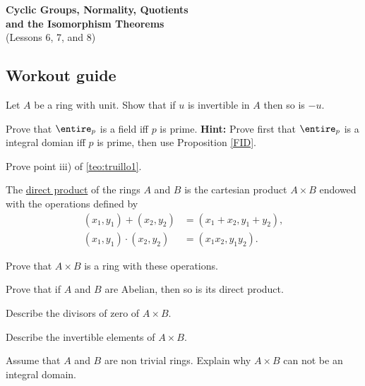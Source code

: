 \documentclass[
    11pt,a4paper,
]{exam}
\begin{document}
\def\contador{Problem Set 3}


\begin{center}
    {\bfseries\Large
        Cyclic Groups, Normality, Quotients  \\ and the Isomorphism Theorems}\\
    (Lessons 6, 7, and 8)
\end{center}


\begin{questions}
    \section{Workout guide}

\begin{ejercicio}
Let $A$ be a ring with unit. Show that if $u$ is invertible in $A$ then so is $-u$.
\end{ejercicio}

\begin{ejercicio}
 Prove that $\entire_p$ is a field iff $p$ is prime. 
 \textbf{Hint:} Prove first that $\entire_p$ is a integral domian iff $p$ is prime, then use Proposition \ref{FID}.
\end{ejercicio}

\begin{ejercicio}
Prove point iii) of \ref{teo:truillo1}.
\end{ejercicio}


\begin{ejercicio}
The \underline{direct product} of the rings $A$ and $B$ is the cartesian product $A\times B$ endowed with the operations defined by
\begin{align*}
(x_1,y_1) + (x_2,y_2) &= (x_1+x_2, y_1+y_2),
\\
(x_1,y_1) \cdot (x_2,y_2) &= (x_1 x_2, y_1 y_2).
\end{align*}
\begin{my_enumerate}
\item Prove that $A\times B$ is a ring with these operations.
\item Prove that if $A$ and $B$ are Abelian, then so is its direct product.
\item Describe the divisors of zero of $A\times B$.
\item Describe the invertible elements of $A\times B$.
\item Assume that $A$ and $B$ are non trivial rings. Explain why $A\times B$ can not be an integral domain.
\end{my_enumerate}
\end{ejercicio}


\end{questions}
\end{document}
